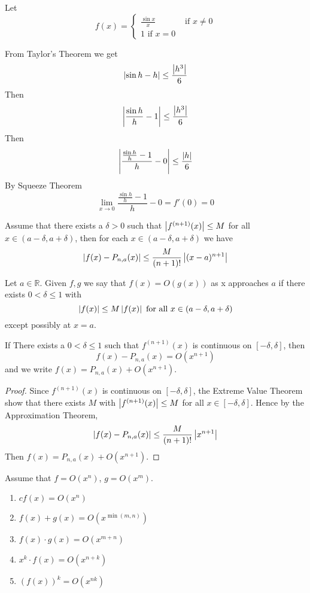 
\begin{exmp}
Let \[f(x) = \begin{cases}
\frac{\sin x}{x} & \text{ if }x\neq 0\\
1 \text{ if } x=0
\end{cases}\]
\end{exmp}


\begin{solution}
From Taylor's Theorem we get \[\left| \sin h - h  \right| \leq \frac{\left| h^3 \right|}{6}\]
Then \[\left| \frac{\sin h}{h} -1 \right| \leq \frac{\left| h^3 \right|}{6}\]
Then \[\left| \frac{\frac{\sin h}{h}-1}{h} - 0 \right|\leq \frac{\left| h \right|}{6}\]
By Squeeze Theorem
\[\lim_{x\to 0} \frac{\frac{\sin h}{h}-1}{h} - 0 = f'(0) = 0\]

\end{solution}

\begin{thm}
Assume that there exists a $\delta > 0$ such that $\left| f^{(n+1)}(x) \right| \leq M$ for all $x\in (a-\delta, a+\delta)$, then for each $x\in (a-\delta,a+\delta)$ we have \[\left| f(x) - P_{n,a} (x) \right| \leq \frac{M}{(n+1)!}\left| (x-a)^{n+1} \right|\]
\end{thm} 


\begin{defn}
Let $a\in \mathbb{R}$. Given $f,g$ we say that $f(x) = O(g(x))$ as x approaches $a$ if there exists $0<\delta \leq 1$ with 
\[\left| f(x) \right|\leq M\left| f(x) \right| \text{ for all } x\in(a-\delta,a+\delta)\] except possibly at $x=a$.
\end{defn}

\begin{thm}
If There exists a $0< \delta \leq 1$ such that $f^{(n+1)}(x)$ is continuous on $[-\delta,\delta]$, then \[f(x) - P_{n,a}(x) = O(x^{n+1})\] and we write $f(x) = P_{n,a}(x) + O(x^{n+1})$.
\end{thm}

\begin{proof}
Since $f^{(n+1)}(x)$ is continuous on $[-\delta,\delta]$, the Extreme Value Theorem show that there exists $M$ with $\left| f^{(n+1)}(x) \right| \leq M$ for all $x\in [-\delta, \delta]$. Hence by the Approximation Theorem,
\[\left| f(x) - P_{n,a}(x) \right|\leq \frac{M}{(n+1)!}\left| x^{n+1} \right|\] Then $f(x) = P_{n,a}(x) + O(x^{n+1})$.
\end{proof}

\begin{thm}
Assume that $f= O(x^n)$, $g = O(x^m)$.
\begin{enumerate}
    \item $cf(x) = O(x^n)$
    \item $f(x) + g(x) = O(x^{\operatorname{min} (m,n)})$
    \item $f(x)\cdot g(x) = O(x^{m+n})$
    \item $x^k\cdot f(x) = O(x^{n+k})$
    \item $(f(x))^k = O(x^{nk})$
\end{enumerate}
\end{thm}

